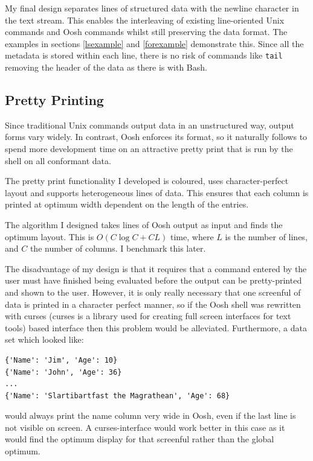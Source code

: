 \documentclass[12pt,twoside,notitlepage]{report}
\begin{document}
My final design separates lines of structured data with the newline
character in the text stream. This enables the interleaving of
existing line-oriented Unix commands and Oosh commands whilst still
preserving the data format. The examples in sections \ref{lsexample}
and \ref{forexample} demonstrate this. Since all the metadata is
stored within each line, there is no risk of commands like {\tt tail}
removing the header of the data as there is with Bash.

\subsection{Pretty Printing}
\label{prettyimpl}
Since traditional Unix commands output data in an unstructured way, output forms
vary widely. In contrast, Oosh enforces its format, so it naturally follows to
spend more development time on an attractive pretty print that is run by the
shell on all conformant data.

The pretty print functionality I developed is coloured, uses character-perfect
layout and supports heterogeneous lines of data. This ensures that each column
is printed at optimum width dependent on the length of the entries.

The algorithm I designed takes lines of Oosh output as input and finds
the optimum layout. This is $O(C \log C + CL)$ time, where $L$ is the
number of lines, and $C$ the number of columns. I benchmark this
later. %

The disadvantage of my design is that it requires that a command
entered by the user must have finished being evaluated before the
output can be pretty-printed and shown to the user. However, it is
only really necessary that one screenful of data is printed in a
character perfect manner, so if the Oosh shell was rewritten with
curses (curses is a library used for creating full screen interfaces
for text tools) based interface then this problem would be
alleviated. Furthermore, a data set which looked like:

\begin{verbatim}
{'Name': 'Jim', 'Age': 10}
{'Name': 'John', 'Age': 36}
...
{'Name': 'Slartibartfast the Magrathean', 'Age': 68}
\end{verbatim}

would always print the name column very wide in Oosh, even if the last
line is not visible on screen. A curses-interface would work better in
this case as it would find the optimum display for that screenful
rather than the global optimum.
\end{document}
